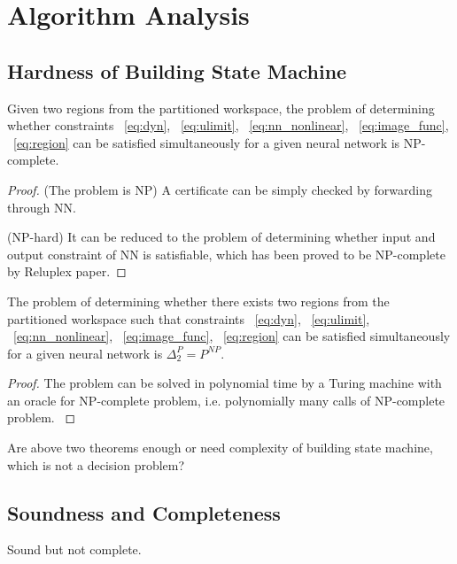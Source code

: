 \section{Algorithm Analysis}

\subsection{Hardness of Building State Machine}

\begin{theorem}
    Given two regions from the partitioned workspace, the problem of determining whether constraints
    ~\eqref{eq:dyn}, ~\eqref{eq:ulimit}, ~\eqref{eq:nn_nonlinear}, ~\eqref{eq:image_func}, ~\eqref{eq:region}
    can be satisfied simultaneously for a given neural network is NP-complete.
\end{theorem}    

\begin{proof}
    {\color{blue} 
    (The problem is NP) A certificate can be simply checked by forwarding through NN.

    (NP-hard) It can be reduced to the problem of determining whether input and output constraint of NN is satisfiable, 
    which has been proved to be NP-complete by Reluplex paper.
    }
\end{proof}


\begin{theorem}
    The problem of determining whether there exists two regions from the partitioned workspace such that constraints
    ~\eqref{eq:dyn}, ~\eqref{eq:ulimit}, ~\eqref{eq:nn_nonlinear}, ~\eqref{eq:image_func}, ~\eqref{eq:region}
    can be satisfied simultaneously for a given neural network is $\Delta_2^P = P^{NP}$.
\end{theorem}    

\begin{proof}
    {\color{blue} 
    The problem can be solved in polynomial time by a Turing machine with an oracle for NP-complete problem, 
    i.e. polynomially many calls of NP-complete problem.
    }
\end{proof}    



{\color{blue} Are above two theorems enough or need complexity of building state machine, which is not a decision problem?}


\subsection{Soundness and Completeness}
{\color{blue} Sound but not complete.}

